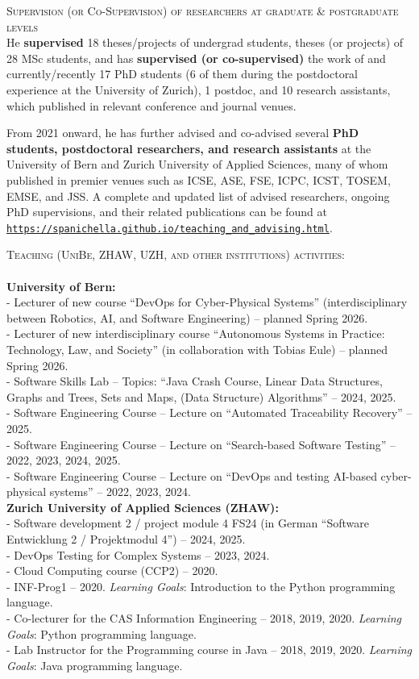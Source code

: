 \documentclass[11pt]{article}
\providecommand*\url[1]{\href{#1}{#1}}
\renewcommand*\url[1]{\href{#1}{\texttt{#1}}}
\begin{document}
 
\medskip \medskip
\textsc{Supervision (or Co-Supervision) of researchers at graduate \& postgraduate levels}
\medskip \\
He \textbf{supervised} 18 theses/projects of undergrad students, theses (or projects) of 28 MSc students, and has \textbf{supervised (or co-supervised)} the work of and currently/recently 17 PhD students (6 of them during the postdoctoral experience at the University of Zurich), 1 postdoc, and 10 research assistants, which published in relevant conference and journal venues. 

From 2021 onward, he has further advised and co-advised several \textbf{PhD students, postdoctoral researchers, and research assistants} at the University of Bern and Zurich University of Applied Sciences, many of whom published in premier venues such as ICSE, ASE, FSE, ICPC, ICST, TOSEM, EMSE, and JSS. A complete and updated list of advised researchers, ongoing PhD supervisions, and their related publications can be found at
\url{https://spanichella.github.io/teaching\_and\_advising.html}.

\textsc{Teaching (UniBe, ZHAW, UZH, and other institutions) activities:}
 \\
\\
\textbf{University of Bern:}
\medskip \\
- Lecturer of new course ``DevOps for Cyber-Physical Systems'' (interdisciplinary between Robotics, AI, and Software Engineering) – planned Spring 2026.\\
- Lecturer of new interdisciplinary course ``Autonomous Systems in Practice: Technology, Law, and Society'' (in collaboration with Tobias Eule) – planned Spring 2026.\\
- Software Skills Lab – Topics: ``Java Crash Course, Linear Data Structures, Graphs and Trees, Sets and Maps, (Data Structure) Algorithms'' – 2024, 2025.\\
- Software Engineering Course – Lecture on ``Automated Traceability Recovery'' – 2025.\\
- Software Engineering Course – Lecture on ``Search-based Software Testing'' – 2022, 2023, 2024, 2025.\\
- Software Engineering Course – Lecture on ``DevOps and testing AI-based cyber-physical systems'' – 2022, 2023, 2024.\\
 

\textbf{Zurich University of Applied Sciences (ZHAW):}
\medskip \\
- Software development 2 / project module 4 FS24 (in German ``Software Entwicklung 2 / Projektmodul 4'') – 2024, 2025.\\
- DevOps Testing for Complex Systems – 2023, 2024.\\
- Cloud Computing course (CCP2) – 2020.\\
- INF-Prog1 – 2020. \textit{Learning Goals}: Introduction to the Python programming language.\\
- Co-lecturer for the CAS Information Engineering – 2018, 2019, 2020. \textit{Learning Goals}: Python programming language.\\
- Lab Instructor for the Programming course in Java – 2018, 2019, 2020. \textit{Learning Goals}: Java programming language.\\
\end{document}
